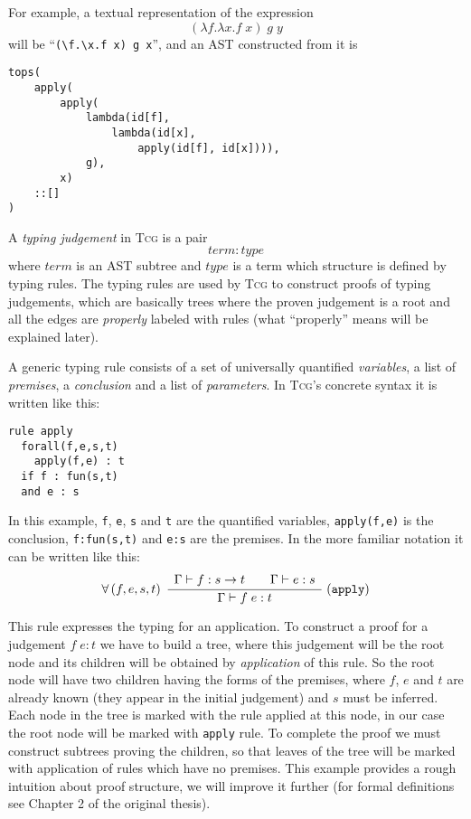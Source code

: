 \documentclass[a4paper,12pt]{article}
\newcommand{\Tcg}{\textsc{Tcg}}
\newcommand{\code}[1]{\texttt{#1}}
\newcounter{premise}
\newcommand{\ifnotempty}[2]{\ifthenelse{\equal{#1}{}}{}{#2}}
\newcommand{\tcgrule}[5]{%
	\setcounter{premise}{0}%
$$%
    \ifnotempty{#1}{%
        \forall \left(#1\right)\;%
    }%
    \dfrac{%
	    \begin{array}[b]{l}%
	    #2%
            \end{array}%
    }{%
            #3%
    }%
    \;\ifnotempty{#4}{(\mathtt{#4}\ifnotempty{#5}{[\mathbf{#5}]})}%
$$%
}
\begin{document}
For example, a textual representation of the expression 
$$(\lambda f.\lambda x. f\; x)\; g\; y$$
will be 
``\code{(\textbackslash f.\textbackslash x.f x) g x}'', 
and an AST constructed from it is%
\begin{verbatim}
tops(
    apply(
        apply(
            lambda(id[f], 
                lambda(id[x], 
                    apply(id[f], id[x]))),
            g),
        x)
    ::[]
)
\end{verbatim}

A \emph{typing judgement} in \Tcg{} is a pair 
$$term : type$$
where $term$ is an AST subtree and $type$ is a term which structure is defined by typing rules. The typing rules are used by \Tcg{} to construct proofs of typing judgements, which are basically trees where the proven judgement is a root and all the edges are \emph{properly} labeled with rules (what ``properly'' means will be explained later). 

A generic typing rule consists of a set of universally quantified \emph{variables}, a list of \emph{premises}, a \emph{conclusion} and a list of \emph{parameters}. In \Tcg{}'s concrete syntax it is written like this:
\begin{verbatim}
rule apply
  forall(f,e,s,t)
    apply(f,e) : t
  if f : fun(s,t)
  and e : s
\end{verbatim}

In this example, \code{f}, \code{e}, \code{s} and \code{t} are the quantified variables, \code{apply(f,e)} is the conclusion, \code{f:fun(s,t)} and \code{e:s} are the premises. In the more familiar notation it can be written like this:
\tcgrule{f, e, s, t}{
    \Gamma \vdash f : s \rightarrow t
    \hspace{20pt}
    \Gamma \vdash e : s
}{\Gamma \vdash f\; e : t}{apply}{}

This rule expresses the typing for an application. To construct a proof for a judgement $f\;e : t$ we have to build a tree, where this judgement will be the root node and its children will be obtained by \emph{application} of this rule. So the root node will have two children having the forms of the premises, where $f$, $e$ and $t$ are already known (they appear in the initial judgement) and $s$ must be inferred. Each node in the tree is marked with the rule applied at this node, in our case the root node will be marked with \code{apply} rule. To complete the proof we must construct subtrees proving the children, so that leaves of the tree will be marked with application of rules which have no premises. This example provides a rough intuition about proof structure, we will improve it further (for formal definitions see Chapter 2 of the original thesis).
\end{document}
